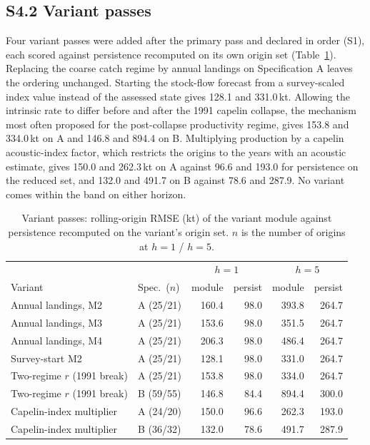 \documentclass[preprint,11pt,authoryear]{elsarticle}
\theoremstyle{remark}
\begin{document}
\FloatBarrier
\subsection*{S4.2 Variant passes}

Four variant passes were added after the primary pass and declared in order (S1), each scored against persistence recomputed on its own origin set (Table~\ref{tab:si_variants}). Replacing the coarse catch regime by annual landings on Specification A leaves the ordering unchanged. Starting the stock-flow forecast from a survey-scaled index value instead of the assessed state gives 128.1 and 331.0\,kt. Allowing the intrinsic rate to differ before and after the 1991 capelin collapse, the mechanism most often proposed for the post-collapse productivity regime, gives 153.8 and 334.0\,kt on A and 146.8 and 894.4 on B. Multiplying production by a capelin acoustic-index factor, which restricts the origins to the years with an acoustic estimate, gives 150.0 and 262.3\,kt on A against 96.6 and 193.0 for persistence on the reduced set, and 132.0 and 491.7 on B against 78.6 and 287.9. No variant comes within the band on either horizon.

\begin{table}[!htb]
\centering\footnotesize\setlength{\tabcolsep}{3.5pt}
\caption{Variant passes: rolling-origin RMSE (kt) of the variant module against persistence recomputed on the variant's origin set. $n$ is the number of origins at $h=1$ / $h=5$.}
\label{tab:si_variants}
\begin{tabular}{@{}llrrrr@{}}
\toprule
 & & \multicolumn{2}{c}{$h=1$} & \multicolumn{2}{c}{$h=5$} \\
Variant & Spec.\ ($n$) & module & persist & module & persist \\
\midrule
Annual landings, M2 & A (25/21) & 160.4 & 98.0 & 393.8 & 264.7 \\
Annual landings, M3 & A (25/21) & 153.6 & 98.0 & 351.5 & 264.7 \\
Annual landings, M4 & A (25/21) & 206.3 & 98.0 & 486.4 & 264.7 \\
Survey-start M2 & A (25/21) & 128.1 & 98.0 & 331.0 & 264.7 \\
Two-regime $r$ (1991 break) & A (25/21) & 153.8 & 98.0 & 334.0 & 264.7 \\
Two-regime $r$ (1991 break) & B (59/55) & 146.8 & 84.4 & 894.4 & 300.0 \\
Capelin-index multiplier & A (24/20) & 150.0 & 96.6 & 262.3 & 193.0 \\
Capelin-index multiplier & B (36/32) & 132.0 & 78.6 & 491.7 & 287.9 \\
\bottomrule
\end{tabular}
\end{table}
\FloatBarrier
\end{document}

